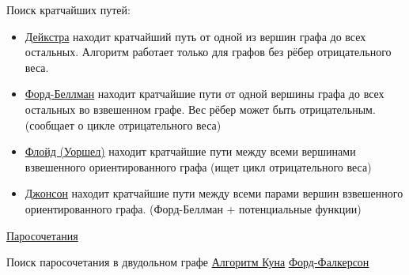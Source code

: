 \documentclass{article}
\begin{document}
Поиск кратчайших путей:
\begin{itemize}
    \item \href{https://neerc.ifmo.ru/wiki/index.php?title=%D0%90%D0%BB%D0%B3%D0%BE%D1%80%D0%B8%D1%82%D0%BC_%D0%94%D0%B5%D0%B9%D0%BA%D1%81%D1%82%D1%80%D1%8B}{Дейкстра}
    находит кратчайший путь от одной из вершин графа до всех остальных. Алгоритм работает только для графов без рёбер отрицательного веса.
    \item \href{https://neerc.ifmo.ru/wiki/index.php?title=%D0%90%D0%BB%D0%B3%D0%BE%D1%80%D0%B8%D1%82%D0%BC_%D0%A4%D0%BE%D1%80%D0%B4%D0%B0-%D0%91%D0%B5%D0%BB%D0%BB%D0%BC%D0%B0%D0%BD%D0%B0}{Форд-Беллман}
    находит кратчайшие пути от одной вершины графа до всех остальных во взвешенном графе. Вес рёбер может быть отрицательным. (сообщает о цикле отрицательного веса)
    \item \href{https://neerc.ifmo.ru/wiki/index.php?title=%D0%90%D0%BB%D0%B3%D0%BE%D1%80%D0%B8%D1%82%D0%BC_%D0%A4%D0%BB%D0%BE%D0%B9%D0%B4%D0%B0}{Флойд (Уоршел)}
    находит кратчайшие пути между всеми вершинами взвешенного ориентированного графа (ищет цикл отрицательного веса)
    \item \href{https://neerc.ifmo.ru/wiki/index.php?title=%D0%90%D0%BB%D0%B3%D0%BE%D1%80%D0%B8%D1%82%D0%BC_%D0%94%D0%B6%D0%BE%D0%BD%D1%81%D0%BE%D0%BD%D0%B0}{Джонсон}
    находит кратчайшие пути между всеми парами вершин взвешенного ориентированного графа. (Форд-Беллман + потенциальные функции)
\end{itemize}

\href{https://neerc.ifmo.ru/wiki/index.php?title=%D0%9F%D0%B0%D1%80%D0%BE%D1%81%D0%BE%D1%87%D0%B5%D1%82%D0%B0%D0%BD%D0%B8%D1%8F:_%D0%BE%D1%81%D0%BD%D0%BE%D0%B2%D0%BD%D1%8B%D0%B5_%D0%BE%D0%BF%D1%80%D0%B5%D0%B4%D0%B5%D0%BB%D0%B5%D0%BD%D0%B8%D1%8F,_%D1%82%D0%B5%D0%BE%D1%80%D0%B5%D0%BC%D0%B0_%D0%BE_%D0%BC%D0%B0%D0%BA%D1%81%D0%B8%D0%BC%D0%B0%D0%BB%D1%8C%D0%BD%D0%BE%D0%BC_%D0%BF%D0%B0%D1%80%D0%BE%D1%81%D0%BE%D1%87%D0%B5%D1%82%D0%B0%D0%BD%D0%B8%D0%B8_%D0%B8_%D0%B4%D0%BE%D0%BF%D0%BE%D0%BB%D0%BD%D1%8F%D1%8E%D1%89%D0%B8%D1%85_%D1%86%D0%B5%D0%BF%D1%8F%D1%85}{Паросочетания}

Поиск паросочетания в двудольном графе
\href{https://neerc.ifmo.ru/wiki/index.php?title=%D0%90%D0%BB%D0%B3%D0%BE%D1%80%D0%B8%D1%82%D0%BC_%D0%9A%D1%83%D0%BD%D0%B0_%D0%B4%D0%BB%D1%8F_%D0%BF%D0%BE%D0%B8%D1%81%D0%BA%D0%B0_%D0%BC%D0%B0%D0%BA%D1%81%D0%B8%D0%BC%D0%B0%D0%BB%D1%8C%D0%BD%D0%BE%D0%B3%D0%BE_%D0%BF%D0%B0%D1%80%D0%BE%D1%81%D0%BE%D1%87%D0%B5%D1%82%D0%B0%D0%BD%D0%B8%D1%8F}{Алгоритм Куна}
\href{https://neerc.ifmo.ru/wiki/index.php?title=%D0%90%D0%BB%D0%B3%D0%BE%D1%80%D0%B8%D1%82%D0%BC_%D0%A4%D0%BE%D1%80%D0%B4%D0%B0-%D0%A4%D0%B0%D0%BB%D0%BA%D0%B5%D1%80%D1%81%D0%BE%D0%BD%D0%B0_%D0%B4%D0%BB%D1%8F_%D0%BF%D0%BE%D0%B8%D1%81%D0%BA%D0%B0_%D0%BC%D0%B0%D0%BA%D1%81%D0%B8%D0%BC%D0%B0%D0%BB%D1%8C%D0%BD%D0%BE%D0%B3%D0%BE_%D0%BF%D0%B0%D1%80%D0%BE%D1%81%D0%BE%D1%87%D0%B5%D1%82%D0%B0%D0%BD%D0%B8%D1%8F}{Форд-Фалкерсон}
\end{document}
